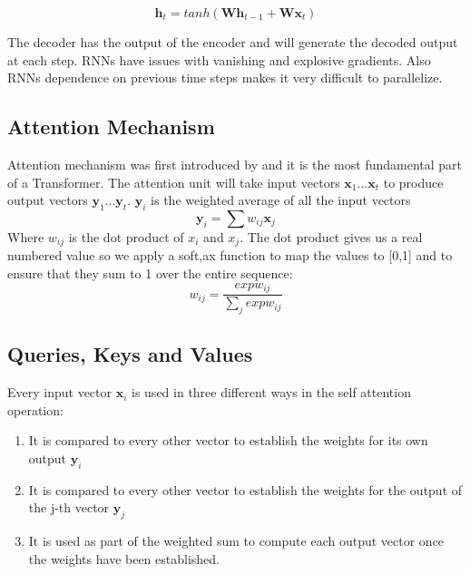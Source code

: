 \begin{equation}
    \mathbf{h}_t = tanh(\mathbf{Wh}_{t-1} + \mathbf{Wx}_t)
\end{equation}

The decoder has the output of the encoder and will generate the decoded output at each step. RNNs have issues with vanishing and explosive gradients. Also RNNs dependence on previous time
steps makes it very difficult to parallelize.

\subsection{Attention Mechanism}

Attention mechanism was first introduced by \cite{attention} and it is the most fundamental part of a Transformer. The attention unit will take input vectors $\mathbf{x}_1...\mathbf{x}_t$ to produce output vectors $\mathbf{y}_1...\mathbf{y}_t$. $\mathbf{y}_i$ is the weighted average of all the input vectors
\begin{equation}
    \mathbf{y}_i = \sum w_{ij}\mathbf{x}_j
\end{equation}
Where $w_{ij}$ is the dot product of $x_i$ and $x_j$. The dot product gives us a real numbered value so we apply a soft,ax function to map the values to [0,1] and to ensure that they sum to 1 over the entire sequence:
\begin{equation}
    w_{ij} = \frac{exp w_{ij}}{\sum_j exp w_{ij}}
\end{equation}
\subsection{Queries, Keys and Values}
Every input vector $\mathbf{x}_i$ is used in three different ways in the self attention operation:
\begin{enumerate}
    \item It is compared to every other vector to establish the weights for its own output $\mathbf{y}_i$
    \item It is compared to every other vector to establish the weights for the output of the j-th vector $\mathbf{y}_j$
    \item It is used as part of the weighted sum to compute each output vector once the weights have been established.

\end{enumerate}

